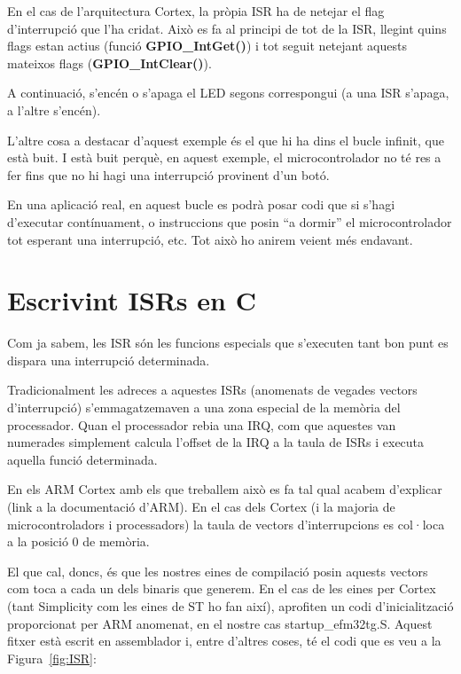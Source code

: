 En el cas de l'arquitectura Cortex, la pròpia ISR ha de netejar el \gls{flag} d'interrupció que l'ha cridat. Això es fa al principi de tot de la \gls{ISR}, llegint quins \glspl{flag} estan actius (funció {\bf GPIO\_IntGet()}) i tot seguit netejant aquests mateixos \glspl{flag} ({\bf GPIO\_IntClear()}).

A continuació, s'encén o s'apaga el LED segons correspongui (a una ISR s'apaga, a l'altre s'encén).

L'altre cosa a destacar d'aquest exemple és el que hi ha dins el bucle infinit, que està buit. I està buit perquè, en aquest exemple, el microcontrolador no té res a fer fins que no hi hagi una interrupció provinent d'un botó.

En una aplicació real, en aquest bucle es podrà posar codi que si s'hagi d'executar contínuament, o instruccions que posin “a dormir” el microcontrolador tot esperant una interrupció, etc. Tot això ho anirem veient més endavant.

\section{Escrivint ISRs en C}
\label{sec:IRQ_example}
Com ja sabem, les \gls{ISR} són les funcions especials que s'executen tant bon punt es dispara una interrupció determinada.

Tradicionalment les adreces a aquestes \glspl{ISR} (anomenats de vegades vectors d'interrupció) s'emmagatzemaven a una zona especial de la memòria del processador. Quan el processador rebia una \gls{IRQ}, com que aquestes van numerades simplement calcula l'offset de la IRQ a la taula de ISRs i executa aquella funció determinada.

En els ARM Cortex amb els que treballem això es fa tal qual acabem d'explicar (link a la documentació d'ARM). En el cas dels Cortex (i la majoria de microcontroladors i processadors) la taula de vectors d'interrupcions es col·loca a la posició 0 de memòria.

El que cal, doncs, és que les nostres eines de compilació posin aquests vectors com toca a cada un dels binaris que generem. En el cas de les eines per Cortex (tant Simplicity com les eines de ST ho fan així), aprofiten un codi d'inicialització proporcionat per ARM anomenat, en el nostre cas startup\_efm32tg.S. Aquest fitxer està escrit en assemblador i, entre d'altres coses, té el codi que es veu a la Figura~\ref{fig:ISR}:

